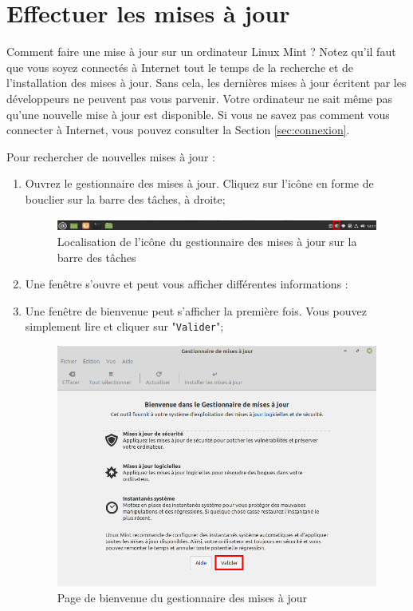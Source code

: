 \documentclass[12pt]{book}
\begin{document}
	\section{Effectuer les mises à jour}
		Comment faire une mise à jour sur un ordinateur Linux Mint ? 
		Notez qu'il faut que vous soyez connectés à Internet tout le temps de la recherche et de l'installation des mises à jour.
		Sans cela, les dernières mises à jour écritent par les développeurs ne peuvent pas vous parvenir. 
		Votre ordinateur ne sait même pas qu'une nouvelle mise à jour est disponible.
		Si vous ne savez pas comment vous connecter à Internet, vous pouvez consulter la Section \ref{sec:connexion}.\par
		Pour rechercher de nouvelles mises à jour :
		\begin{enumerate}
			\item Ouvrez le gestionnaire des mises à jour. Cliquez sur l'icône en forme de bouclier sur la barre des tâches, à droite;
			\begin{figure}[h]
				\centering
				\includegraphics[width=\textwidth]{include/maj_barre.png}
				\caption{Localisation de l'icône du gestionnaire des mises à jour sur la barre des tâches}
				\label{fig:maj_barre}
			\end{figure}
			\item Une fenêtre s'ouvre et peut vous afficher différentes informations :
			\item Une fenêtre de bienvenue peut s'afficher la première fois.
					Vous pouvez simplement lire et cliquer sur "\texttt{Valider}";
			\begin{figure}[h]
				\centering
				\includegraphics[width=.4\textwidth]{include/maj_accueil.png}
				\caption{Page de bienvenue du gestionnaire des mises à jour}
				\label{fig:maj_accueil}
			\end{figure}
				\begin{figure}[h]
					\begin{subfigure}{.5\textwidth}
						\centering

\end{subfigure}
\end{figure}
\end{enumerate}
\end{document}
